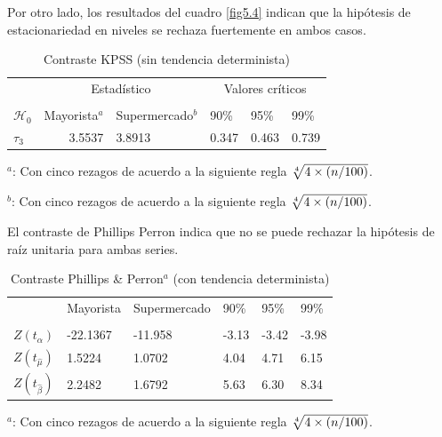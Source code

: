 \documentclass[12pt, twoside]{book}\usepackage[]{graphicx}\usepackage[]{color}
\numberwithin{equation}{section}
\numberwithin{theorem}{section}
\numberwithin{teorema}{section}
\numberwithin{defi}{section}
\numberwithin{prop}{section}
\numberwithin{defi}{section}
\theoremstyle{plain}
\begin{document}
Por otro lado, los resultados del cuadro \ref{fig5.4} indican que la hipótesis de estacionariedad en niveles se rechaza fuertemente en ambos casos. 

\begin{table}[h]
\centering
\begin{threeparttable}
\caption{Contraste KPSS (sin tendencia determinista) \label{fig5.4}}
\begin{tabular}{@{}lrllll@{}}
\toprule
\multicolumn{1}{l}{} & \multicolumn{2}{c}{Estadístico} &
\multicolumn{3}{c}{Valores críticos} \\
\cmidrule(l){2-3} \cmidrule(l){4-6} \\
\multicolumn{1}{l}{$\mathcal{H}_0$} & \multicolumn{1}{c}{Mayorista$^{a}$} &
 \multicolumn{1}{c}{Supermercado$^{b}$} &
\multicolumn{1}{l}{90\%}&
\multicolumn{1}{l}{95\%}&
\multicolumn{1}{l}{99\%}
\\
\midrule
$\tau_{3} $  & 3.5537 &  3.8913 & 0.347 & 0.463 & 0.739 \\
\bottomrule
\end{tabular}
\label{tab-7}
\begin{tablenotes}
\small 
\item $^{a}$: Con cinco rezagos de acuerdo a la siguiente regla $\root 4 \of {4 \times (n/100)}$. 
\item $^{b}$: Con cinco rezagos de acuerdo a la siguiente regla $\root 4 \of {4 \times (n/100)}$. 
\end{tablenotes}
\end{threeparttable}
\end{table}

El contraste de Phillips Perron indica que no se puede rechazar la hipótesis de raíz unitaria para ambas series. 



\begin{table}[h]
\centering
\begin{threeparttable}
\caption{Contraste Phillips \& Perron$^{a}$ (con tendencia determinista)\label{tab:pperron1}}
\begin{tabular}{@{}llllll@{}}
\toprule
\multicolumn{1}{c}{} &
\multicolumn{1}{l}{Mayorista} &
\multicolumn{1}{l}{Supermercado} & 
90\% & 95\% & 99\% 
\\
\cmidrule(l){2-2} \cmidrule(l){3-3} \cmidrule(l){4-6} \\
$Z(t_{\hat{\alpha}})$ &-22.1367 & -11.958 & -3.13 & -3.42 & -3.98 \\ 
$Z(t_{\hat{\mu}})$    &  1.5224 & 1.0702  &  4.04 & 4.71  & 6.15  \\ 
$Z(t_{\hat{\beta}})$  &  2.2482 & 1.6792  &  5.63 & 6.30  & 8.34 \\
\bottomrule
\end{tabular}
\label{tab-4}
\begin{tablenotes}
\small 
\item $^{a}$: Con cinco rezagos de acuerdo a la siguiente regla $\root 4 \of {4 \times (n/100)}$. 
\end{tablenotes}
\end{threeparttable}
\end{table}
\end{document}
